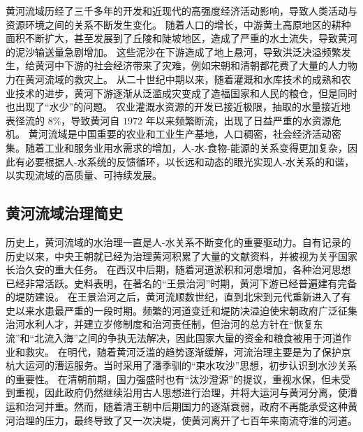黄河流域历经了三千多年的开发和近现代的高强度经济活动影响，导致人类活动与资源环境之间的关系不断发生变化\cite{fu2021a}。
随着人口的增长，中游黄土高原地区的耕种面积不断扩大，甚至发展到了丘陵和陡坡地区，造成了严重的水土流失，导致黄河的泥沙输送量急剧增加\cite{wu2020a}。
这些泥沙在下游造成了地上悬河，导致洪泛决溢频繁发生，给黄河中下游的社会经济带来了灾难，例如宋朝和清朝都花费了大量的人力物力在黄河流域的救灾上。
从二十世纪中期以来，随着灌溉和水库技术的成熟和农业技术的进步，黄河下游逐渐从泛滥成灾变成了造福国家和人民的粮仓，但是同时也出现了“水少”的问题。
农业灌溉水资源的开发已接近极限，抽取的水量接近地表径流的 $8\%$，导致黄河自 $1972$ 年以来频繁断流，出现了日益严重的水资源危机。
黄河流域是中国重要的农业和工业生产基地，人口稠密，社会经济活动密集。随着工业和服务业用水需求的增加，人-水-食物-能源的关系变得更加复杂，因此有必要根据人-水系统的反馈循环，以长远和动态的眼光实现人-水关系的和谐，以实现流域的高质量、可持续发展。

\subsection{黄河流域治理简史}

历史上，黄河流域的水治理一直是人-水关系不断变化的重要驱动力。自有记录的历史以来，中央王朝就已经为治理黄河积累了大量的文献资料，并被视为关乎国家长治久安的重大任务。
在西汉中后期，随着河道淤积和河患增加，各种治河思想已经非常活跃。史料表明，在著名的“王景治河”时期，黄河下游已经普遍建有完备的堤防建设\cite{WangWeiJing2009}。
在王景治河之后，黄河流顺数世纪，直到北宋到元代重新进入了有史以来水患最严重的一段时期。频繁的河道变迁和堤防决溢迫使宋朝政府广泛征集治河水利人才，并建立岁修制度和治河责任制，但治河的总方针在“恢复东流”和“北流入海”之间的争执无法解决，因此国家大量的资金和粮食被用于河道作业和救灾\cite{WangWeiJing2009, yang2019}。
在明代，随着黄河泛滥的趋势逐渐缓解，河流治理主要是为了保护京杭大运河的漕运服务。当时采用了潘季驯的“束水攻沙”思想，初步认识到水沙关系的重要性\cite{WangWeiJing2009}。
在清朝前期，国力强盛时也有“汰沙澄源”的提议，重视水保，但未受到重视，因此政府仍然继续沿用古人思想进行治理，并将大运河与黄河分离，使漕运和治河并重。然而，随着清王朝中后期国力的逐渐衰弱，政府不再能承受这种黄河治理的压力，最终导致了又一次决堤，使黄河离开了七百年来南流夺淮的河道\cite{WangWeiJing2009}。


